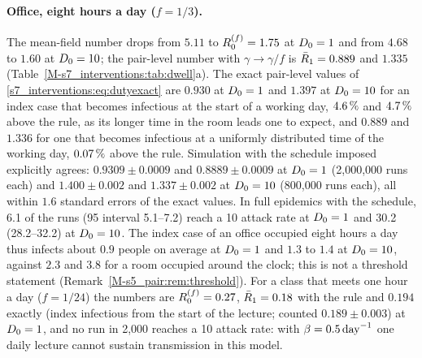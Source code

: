 \paragraph{Office, eight hours a day ($f=1/3$).} The mean-field number drops from $5.11$ to
$R_0^{(f)}=1.75$ at $D_0=1$ and from $4.68$ to $1.60$ at $D_0=10$; the pair-level number with
$\gamma\to\gamma/f$ is $\bar{R}_1=0.889$ and $1.335$ (Table~\ref{M-s7_interventions:tab:dwell}a). The exact
pair-level values of \eqref{s7_interventions:eq:dutyexact} are $0.930$ at $D_0=1$ and $1.397$ at $D_0=10$ for
an index case that becomes infectious at the start of a working day, $4.6\,\%$ and $4.7\,\%$ above the rule,
as its longer time in the room leads one to expect, and $0.889$ and $1.336$ for one that becomes infectious
at a uniformly distributed time of the working day, $0.07\,\%$ above the rule.
Simulation with the schedule imposed explicitly agrees: $0.9309\pm0.0009$ and $0.8889\pm0.0009$ at $D_0=1$
(2{,}000{,}000 runs each) and $1.400\pm0.002$ and $1.337\pm0.002$ at $D_0=10$ (800{,}000 runs each), all
within $1.6$ standard errors of the exact values.
In full epidemics with the schedule, 6.1\pct{} of the runs (95\pct{} interval 5.1--7.2\pct) reach a 10\pct{} attack
rate at $D_0=1$ and 30.2\pct{} (28.2--32.2\pct) at $D_0=10$. The index case of an office occupied eight hours a
day thus infects about $0.9$ people on average at $D_0=1$ and $1.3$ to $1.4$ at $D_0=10$, against $2.3$ and
$3.8$ for a room occupied around the clock; this is not a threshold statement
(Remark~\ref{M-s5_pair:rem:threshold}).
For a class that meets one hour a day ($f=1/24$) the numbers are $R_0^{(f)}=0.27$, $\bar{R}_1=0.18$ with the
rule and $0.194$ exactly (index infectious from the start of the lecture; counted $0.189\pm0.003$) at
$D_0=1$, and no run in 2,000 reaches a 10\pct{} attack rate: with $\beta=0.5\,\mathrm{day}^{-1}$ one daily lecture cannot
sustain transmission in this model.

